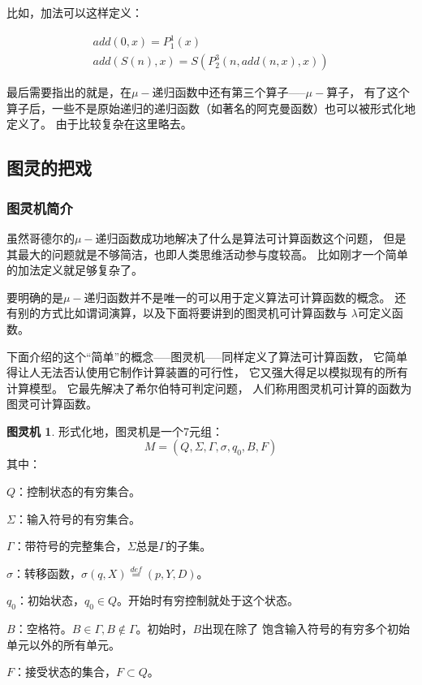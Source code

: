 \documentclass[12pt,a4paper,oneside]{ctexrep}
\theoremstyle{definition}
\newtheorem{tm}{图灵机}
\begin{document}
比如，加法可以这样定义：

\begin{equation}
\begin{split}
add(0,x)=P_1^1(x)\\
add(S(n),x)=S(P_2^3(n,add(n,x),x))
\end{split}
\end{equation}

最后需要指出的就是，在$\mu-$递归函数中还有第三个算子-----$\mu-$算子，
有了这个算子后，一些不是原始递归的递归函数（如著名的阿克曼函数）也可以被形式化地定义了。
由于比较复杂在这里略去。

\subsection{图灵的把戏}

\subsubsection{图灵机简介}
虽然哥德尔的$\mu-$递归函数成功地解决了什么是算法可计算函数这个问题，
但是其最大的问题就是不够简洁，也即人类思维活动参与度较高。
比如刚才一个简单的加法定义就足够复杂了。

要明确的是$\mu-$递归函数并不是唯一的可以用于定义算法可计算函数的概念。
还有别的方式比如谓词演算，以及下面将要讲到的图灵机可计算函数与
$\lambda$可定义函数。

下面介绍的这个“简单”的概念-----图灵机-----同样定义了算法可计算函数，
它简单得让人无法否认使用它制作计算装置的可行性，
它又强大得足以模拟现有的所有计算模型。
它最先解决了希尔伯特可判定问题，
人们称用图灵机可计算的函数为图灵可计算函数。

\begin{tm}
形式化地，图灵机是一个7元组\cite{ialc}：
\begin{equation}
M=(Q,\Sigma,\Gamma,\sigma,q_0,B,F)
\end{equation}
其中：

$Q$：控制状态的有穷集合。

$\Sigma$：输入符号的有穷集合。

$\Gamma$：带符号的完整集合，$\Sigma$总是$\Gamma$的子集。

$\sigma$：转移函数，$\sigma(q,X) \stackrel{def}{=} (p,Y,D)$。

$q_0$：初始状态，$q_0 \in Q$。开始时有穷控制就处于这个状态。

$B$：空格符。$B \in \Gamma,B \notin \Gamma$。初始时，$B$出现在除了
饱含输入符号的有穷多个初始单元以外的所有单元。

$F$：接受状态的集合，$F \subset Q$。

\end{tm}
\end{document}

